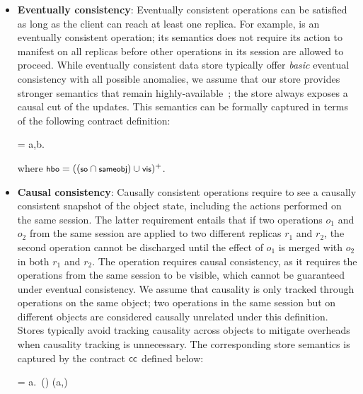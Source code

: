 \begin{itemize}
\setlength{\itemsep}{2pt}

\item \textbf{Eventually consistency}: Eventually consistent operations can
  be satisfied as long as the client can reach at least one replica. For
  example,  is an eventually consistent operation; its semantics
  does not require its action to manifest on all replicas before other
  operations in its session are allowed to proceed. While eventually
  consistent data store typically offer \emph{basic} eventual consistency
  with all possible anomalies, we assume that our store provides stronger
  semantics that remain highly-available~\cite{BailisHAT,COPS}; the store
  always exposes a causal cut of the updates. This semantics can be formally
  captured in terms of the following contract definition:

  \vspace{-1em}
  \begin{smathpar}
  \ecc = \forall a,b. ~ \wedge {} \Rightarrow {}
  \end{smathpar}
  \noindent where $\small \hboZ = ((\soZ \cap \sameobjZ) \cup \visZ)^+$.

\item \textbf{Causal consistency}: Causally consistent operations
  require to see a causally consistent snapshot of the object state,
  including the actions performed on the same session.  The latter
  requirement entails that if two operations $o_1$ and $o_2$ from the
  same session are applied to two different replicas $r_1$ and $r_2$,
  the second operation cannot be discharged until the effect of $o_1$ is
  merged with $o_2$ in both $r_1$ and $r_2$. The 
  operation requires causal consistency, as it requires the operations
  from the same session to be visible, which cannot be guaranteed under
  eventual consistency. We assume that causality is only tracked through
  operations on the same object; two operations in the same session but
  on different objects are considered causally unrelated under this
  definition. Stores typically avoid tracking causality across objects
  to mitigate overheads when causality tracking is unnecessary. The
  corresponding store semantics is captured by the contract ${\sf cc}$
  defined below:

  \vspace{-1em}
  \begin{smathpar}
  \ccc = \forall a.~(\hboZ \cap \sameobjZ) (a,\cureff) \Rightarrow {}
  \end{smathpar}


\end{itemize}
